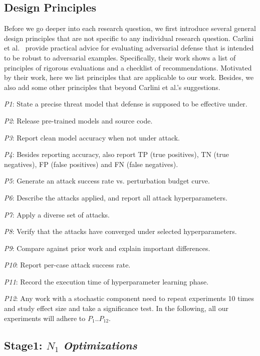 \subsection{Design Principles}

Before we go deeper into each research question, we first introduce several general design principles that are not specific to any individual research question. Carlini et al.~\cite{carlini2019evaluating} provide practical advice for evaluating adversarial defense that is intended to be robust to adversarial examples. Specifically, their work shows a list of principles of rigorous evaluations and a checklist of recommendations. Motivated by their work, here we list principles that are applicable to our work. Besides, we also add some other principles that beyond Carlini et al.'s suggestions.

\bi
\item \textit{P1}: State a precise threat model that defense is supposed to be effective under.
\item \textit{P2}: Release pre-trained models and source code.
\item \textit{P3}: Report clean model accuracy when not under attack.
\item \textit{P4}: Besides reporting accuracy, also report TP (true positives), TN (true negatives), FP (false positives) and FN (false negatives).
\item \textit{P5}: Generate an attack success rate vs. perturbation budget curve.
\item \textit{P6}: Describe the attacks applied, and report all attack hyperparameters.
\item \textit{P7}: Apply a diverse set of attacks.
\item \textit{P8}: Verify that the attacks have converged under selected hyperparameters.
\item \textit{P9}: Compare against prior work and explain important differences.
\item \textit{P10}: Report per-case attack success rate.
\item \textit{P11}: Record the execution time of hyperparameter learning phase.
\item \textit{P12}: Any work with a stochastic component need to repeat experiments 10 times and study effect size and take a significance test.
\ei
In the following,
all our experiments will adhere
to $P_1..P_{12}$.


\subsection{Stage1: $N_1$ {\em Optimizations}}
 
